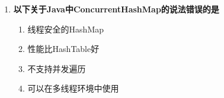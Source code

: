 \documentclass[12pt, a4paper]{ctexart}
\begin{document}
\begin{enumerate}[label=\textbf{\arabic*.}]
\begin{bluebox}{答案与深度解析}
\begin{itemize}[label={}, leftmargin=*, nosep]
		      \item \textbf{B. 性能比锁差 — 错误}
		      \begin{itemize}[label={}, leftmargin=*, nosep]
			      \item \textbf{CAS优势}：无锁算法，通常比synchronized性能好
		      \end{itemize}

		      \item \textbf{C. 不能用于并发场景 — 错误}
		      \begin{itemize}[label={}, leftmargin=*, nosep]
			      \item \textbf{恰恰相反}：专为并发场景设计
		      \end{itemize}

		      \item \textbf{D. 只支持整数类型 — 错误}
		      \begin{itemize}[label={}, leftmargin=*, nosep]
			      \item \textbf{支持类型}：整数、布尔、引用、数组等
		      \end{itemize}

		      \end{itemize}

		      \textbf{【应背诵知识点（命题人思维版）】}
		      \begin{enumerate}[label={}, leftmargin=*, nosep]
			      \item \textbf{Atomic类优势}：
			            \begin{itemize}[label={}, nosep]
				            \item 无锁算法，性能好
				            \item 支持多种类型
				            \item 提供CAS操作
			            \end{itemize}
		      \end{enumerate}

		      \textbf{【命题趋势与实战策略】}

		      \textbf{考场秒杀技巧}：Atomic = 无锁 + 原子 + 高性能
	      \end{bluebox}

	\item \textbf{以下关于Java中ConcurrentHashMap的说法错误的是}
	      \begin{enumerate}[label=\Alph*.]
		      \item 线程安全的HashMap
		      \item 性能比HashTable好
		      \item 不支持并发遍历
		      \item 可以在多线程环境中使用
	      \end{enumerate}


\end{enumerate}
\end{document}
